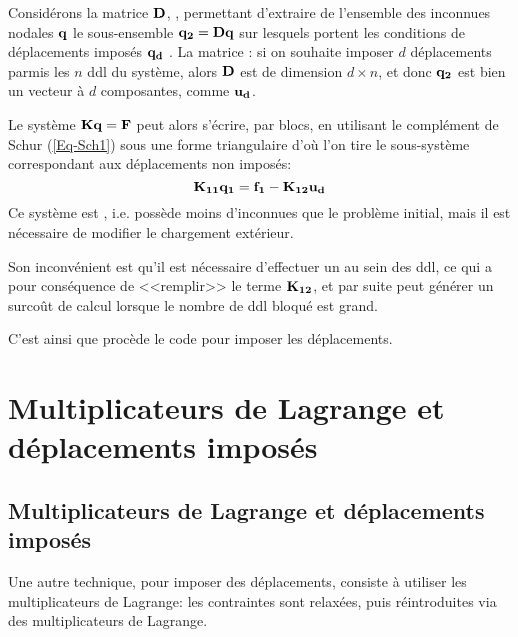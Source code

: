 \medskip
Considérons la matrice $\mathbf{D}$, , permettant d'extraire de l'ensemble des inconnues
nodales $\mathbf{q}$ le sous-ensemble $\mathbf{q_2}=\mathbf{D}\mathbf{q}$ sur lesquels portent les conditions de déplacements imposés $\mathbf{q_d}$
.
La matrice : si on souhaite imposer $d$ déplacements parmis les $n$ ddl
du système, alors $\mathbf{D}$ est de dimension $d\times n$, et donc $\mathbf{q_2}$ est bien un vecteur à $d$ composantes,
comme $\mathbf{u_d}$.

\medskip
Le système $\mathbf{K}\mathbf{q}=\mathbf{F}$ peut alors s'écrire, par blocs, en utilisant le complément de Schur (\ref{Eq-Sch1}) sous une
forme triangulaire d'où l'on tire le sous-système correspondant aux déplacements non imposés:
\begin{equation}
\mathbf{K_{11}}\mathbf{q_1} = \mathbf{f_1} - \mathbf{K_{12}}\mathbf{u_d}
\end{equation}
\medskipvm
Ce système est , i.e. possède moins d'inconnues que le problème initial, mais il est nécessaire de
modifier le chargement extérieur.

Son inconvénient est qu'il est nécessaire d'effectuer un  au sein des ddl, ce qui a pour conséquence de 
<<remplir>> le terme $\mathbf{K_{12}}$, et par suite peut générer un surcoût de calcul lorsque le nombre de ddl bloqué
est grand.

C'est ainsi que procède le code \abaqus pour imposer les déplacements.

\medskip
\ifVersionAvecExemplesSepares
   \section{Multiplicateurs de Lagrange et déplacements imposés}\label{Sec-cast}
\else
   \subsection{Multiplicateurs de Lagrange et déplacements imposés}\label{Sec-cast}
\fi

Une autre technique, pour imposer des déplacements, consiste à utiliser les multiplicateurs de Lagrange: les contraintes sont relaxées, puis réintroduites via des multiplicateurs de Lagrange.

